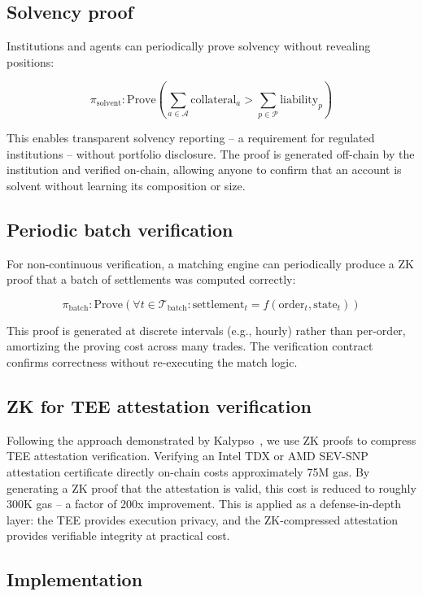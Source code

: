 \documentclass[11pt,a4paper]{article}
\begin{document}
\subsection{Solvency proof}

Institutions and agents can periodically prove solvency without revealing positions:

\[
\pi_{\text{solvent}} : \text{Prove}\left( \sum_{a \in \mathcal{A}} \text{collateral}_a > \sum_{p \in \mathcal{P}} \text{liability}_p \right)
\]

This enables transparent solvency reporting -- a requirement for regulated institutions -- without portfolio disclosure. The proof is generated off-chain by the institution and verified on-chain, allowing anyone to confirm that an account is solvent without learning its composition or size.

\subsection{Periodic batch verification}

For non-continuous verification, a matching engine can periodically produce a ZK proof that a batch of settlements was computed correctly:

\[
\pi_{\text{batch}} : \text{Prove}\left( \forall t \in \mathcal{T}_{\text{batch}}: \text{settlement}_t = f(\text{order}_t, \text{state}_t) \right)
\]

This proof is generated at discrete intervals (e.g., hourly) rather than per-order, amortizing the proving cost across many trades. The verification contract confirms correctness without re-executing the match logic.

\subsection{ZK for TEE attestation verification}

Following the approach demonstrated by Kalypso~\cite{marlin_kalypso}, we use ZK proofs to compress TEE attestation verification. Verifying an Intel TDX or AMD SEV-SNP attestation certificate directly on-chain costs approximately 75M gas. By generating a ZK proof that the attestation is valid, this cost is reduced to roughly 300K gas -- a factor of 200x improvement. This is applied as a defense-in-depth layer: the TEE provides execution privacy, and the ZK-compressed attestation provides verifiable integrity at practical cost.

\subsection{Implementation}
\end{document}
